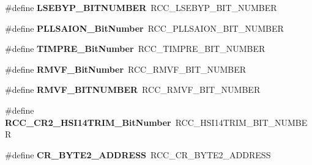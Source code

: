 \begin{DoxyCompactItemize}
\item 
\#define {\bfseries L\+S\+E\+B\+Y\+P\+\_\+\+B\+I\+T\+N\+U\+M\+B\+ER}~R\+C\+C\+\_\+\+L\+S\+E\+B\+Y\+P\+\_\+\+B\+I\+T\+\_\+\+N\+U\+M\+B\+ER\hypertarget{group___h_a_l___r_c_c___aliased_ga6af20e20f5b32e8a85f607ea43c338df}{}\label{group___h_a_l___r_c_c___aliased_ga6af20e20f5b32e8a85f607ea43c338df}

\item 
\#define {\bfseries P\+L\+L\+S\+A\+I\+O\+N\+\_\+\+Bit\+Number}~R\+C\+C\+\_\+\+P\+L\+L\+S\+A\+I\+O\+N\+\_\+\+B\+I\+T\+\_\+\+N\+U\+M\+B\+ER\hypertarget{group___h_a_l___r_c_c___aliased_ga786a15b370532d6429e03a9f9d226be7}{}\label{group___h_a_l___r_c_c___aliased_ga786a15b370532d6429e03a9f9d226be7}

\item 
\#define {\bfseries T\+I\+M\+P\+R\+E\+\_\+\+Bit\+Number}~R\+C\+C\+\_\+\+T\+I\+M\+P\+R\+E\+\_\+\+B\+I\+T\+\_\+\+N\+U\+M\+B\+ER\hypertarget{group___h_a_l___r_c_c___aliased_ga3e4d33566ef60a5220ce491e74a34478}{}\label{group___h_a_l___r_c_c___aliased_ga3e4d33566ef60a5220ce491e74a34478}

\item 
\#define {\bfseries R\+M\+V\+F\+\_\+\+Bit\+Number}~R\+C\+C\+\_\+\+R\+M\+V\+F\+\_\+\+B\+I\+T\+\_\+\+N\+U\+M\+B\+ER\hypertarget{group___h_a_l___r_c_c___aliased_ga3a0580593374569f2663f1432812f8fe}{}\label{group___h_a_l___r_c_c___aliased_ga3a0580593374569f2663f1432812f8fe}

\item 
\#define {\bfseries R\+M\+V\+F\+\_\+\+B\+I\+T\+N\+U\+M\+B\+ER}~R\+C\+C\+\_\+\+R\+M\+V\+F\+\_\+\+B\+I\+T\+\_\+\+N\+U\+M\+B\+ER\hypertarget{group___h_a_l___r_c_c___aliased_gad4cc72917b15affc54b4d28e6529634c}{}\label{group___h_a_l___r_c_c___aliased_gad4cc72917b15affc54b4d28e6529634c}

\item 
\#define {\bfseries R\+C\+C\+\_\+\+C\+R2\+\_\+\+H\+S\+I14\+T\+R\+I\+M\+\_\+\+Bit\+Number}~R\+C\+C\+\_\+\+H\+S\+I14\+T\+R\+I\+M\+\_\+\+B\+I\+T\+\_\+\+N\+U\+M\+B\+ER\hypertarget{group___h_a_l___r_c_c___aliased_ga407a7f1f6db8025f2e21fbde11d65176}{}\label{group___h_a_l___r_c_c___aliased_ga407a7f1f6db8025f2e21fbde11d65176}

\item 
\#define {\bfseries C\+R\+\_\+\+B\+Y\+T\+E2\+\_\+\+A\+D\+D\+R\+E\+SS}~R\+C\+C\+\_\+\+C\+R\+\_\+\+B\+Y\+T\+E2\+\_\+\+A\+D\+D\+R\+E\+SS\hypertarget{group___h_a_l___r_c_c___aliased_ga0193aa09fc91ebd9a119c8d98e6184a9}{}\label{group___h_a_l___r_c_c___aliased_ga0193aa09fc91ebd9a119c8d98e6184a9}


\end{DoxyCompactItemize}
